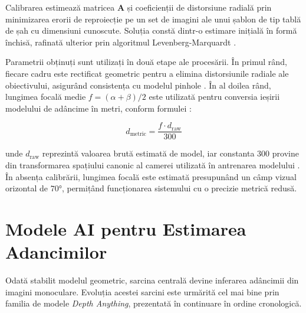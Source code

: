 Calibrarea estimează matricea $\mathbf{A}$ și coeficienții de distorsiune radială prin minimizarea erorii de reproiecție pe un set de imagini ale unui șablon de tip tablă de șah cu dimensiuni cunoscute. Soluția constă dintr-o estimare inițială în formă închisă, rafinată ulterior prin algoritmul Levenberg-Marquardt \cite{zhang2000}.

Parametrii obținuți sunt utilizați în două etape ale procesării. În primul rând, fiecare cadru este rectificat geometric pentru a elimina distorsiunile radiale ale obiectivului, asigurând consistența cu modelul pinhole \cite{hartley2004}. În al doilea rând, lungimea focală medie $f = (\alpha +
\beta)/2$ este utilizată pentru conversia ieșirii modelului de adâncime în metri, conform formulei \cite{depthanything3}:

\begin{equation}
    d_{\text{metric}} = \frac{f \cdot d_{\text{raw}}}{300}
\end{equation}

unde $d_{\text{raw}}$ reprezintă valoarea brută estimată de model, iar constanta $300$ provine din transformarea spațiului canonic al camerei utilizată în antrenarea modelului \cite{depthanything3}. În absența calibrării, lungimea focală este estimată presupunând un câmp vizual orizontal de $70°$, permițând funcționarea sistemului cu o precizie metrică redusă.

\section{Modele AI pentru Estimarea Adancimilor}
\label{sec:ch2sec2}

\par Odată stabilit modelul geometric, sarcina centrală devine inferarea adâncimii din imagini monoculare. Evoluția acestei sarcini este urmărită cel mai bine prin familia de modele \emph{Depth Anything}, prezentată în continuare în ordine cronologică.

